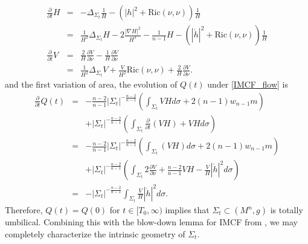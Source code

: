 \documentclass[12pt,twoside]{article}
\theoremstyle{plain}
\theoremstyle{definition}
\theoremstyle{remark}
\numberwithin{equation}{section}
\begin{document}

\begin{eqnarray}
    \frac{\partial}{\partial t} H &=& -\Delta_{\Sigma_{t}} \frac{1}{H} - \left(|h|^{2} + \text{Ric}(\nu,\nu) \right) \frac{1}{H} \nonumber \\
                                  &=& \frac{1}{H^{2}} \Delta_{\Sigma_{t}} H - 2 \frac{|\nabla H|^{2}}{H^{3}} - \frac{1}{n-1} H - \left({|\mathring{h}|^{2}} + \text{Ric}(\nu,\nu) \right) \frac{1}{H} \label{H_evolution} \\
    \frac{\partial}{\partial t} V &=& \frac{2}{H} \frac{\partial V}{\partial \nu} - \frac{1}{H} \frac{\partial V}{\partial \nu} \nonumber \\
                                  &=& \frac{1}{H^{2}} \Delta_{\Sigma_{t}} V + \frac{V}{H^{2}} \text{Ric}(\nu,\nu) + \frac{2}{H} \frac{\partial V}{\partial \nu}. \nonumber
\end{eqnarray}
and the first variation of area, the evolution of $Q(t)$ under \eqref{IMCF_flow} is
\begin{eqnarray*}
   \frac{\partial}{\partial t} Q(t) &=&-\frac{n-2}{n-1} |\Sigma_{t}|^{-\frac{n-2}{n-1}} \left(\int_{\Sigma_{t}} VH d\sigma + 2(n-1) w_{n-1} m \right) \\
   & & + |\Sigma_{t}|^{-\frac{n-2}{n-1}} \left(\int_{\Sigma_{t}} \frac{\partial}{\partial t} (VH) + VH d\sigma\right ) \\
    &=&  -\frac{n-2}{n-1} |\Sigma_{t}|^{-\frac{n-2}{n-1}} \left(\int_{\Sigma_{t}} (VH) d\sigma + 2(n-1) w_{n-1} m \right) \\
    & & + |\Sigma_{t}|^{-\frac{n-2}{n-1}} \left(\int_{\Sigma_{t}} 2 \frac{\partial V}{\partial \nu} + \frac{n-2}{n-1} VH - \frac{V}{H} |\mathring{h}|^{2} d\sigma \right) \\
    &=& - |\Sigma_{t}|^{-\frac{n-2}{n-1}} \int_{\Sigma_{t}} \frac{V}{H} |\mathring{h}|^{2} d\sigma.
\end{eqnarray*}
Therefore, $Q(t) = Q(0)$ for $t \in [T_{0},\infty)$ implies that $\Sigma_{t} \subset (M^{n},g)$ is totally umbilical. Combining this with the blow-down lemma for IMCF from \cite{HI}, we may completely characterize the intrinsic geometry of $\Sigma_{t}$.

\end{document}
